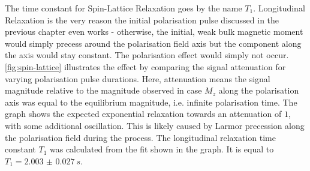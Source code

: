 \documentclass[
    parskip=half, 
    twoside=false,
    twocolumn=true,
    fontsize=11pt,
]{scrarticle}
\begin{document}
The time constant for Spin-Lattice Relaxation goes by the name $T_1$. Longitudinal Relaxation is the very reason the initial polarisation pulse discussed in the previous chapter even works - otherwise, the initial, weak bulk magnetic moment would simply precess around the polarisation field axis but the component along the axis would stay constant. The polarisation effect would simply not occur. \autoref{fig:spin-lattice} illustrates the effect by comparing the signal attenuation for varying polarisation pulse durations. Here, attenuation means the signal magnitude relative to the magnitude observed in case $M_z$ along the polarisation axis was equal to the equilibrium magnitude, i.e. infinite polarisation time. The graph shows the expected exponential relaxation towards an attenuation of $1$, with some additional oscillation. This is likely caused by Larmor precession along the polarisation field during the process. The longitudinal relaxation time constant $T_1$ was calculated from the fit shown in the graph. It is equal to $T_1 = \SI{2.003(27)}{s}$.
\end{document}

